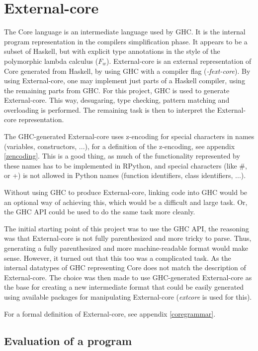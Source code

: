 
\section{External-core}


The Core language is an intermediate language used by GHC. It is the internal
program representation in the compilers simplification phase. It appears to be a
subset of Haskell, but with explicit type annotations in the style of the polymorphic
lambda calculus ($F_w$). External-core
is an external representation of Core generated from Haskell, by using GHC with a compiler 
flag (\emph{-fext-core}). By using External-core, one
may implement just parts of a Haskell compiler, using the remaining parts from
GHC. For this project, GHC is used to generate External-core. This way, desugaring,
type checking, pattern matching and overloading is performed. The remaining task
is then to interpret the External-core representation. \cite{tolmach2010ghc}

The GHC-generated External-core uses z-encoding for special characters in names 
(variables, constructors, ...), for
a definition of the z-encoding, see appendix \ref{zencoding}. This is a good thing, as much
of the functionality represented by these names has to be implemented in RPython,
and special characters (like \#{}, or +) is not allowed in Python names (function
identifiers, class identifiers, ...).

Without using GHC to produce External-core, linking code into GHC would be an 
optional way of achieving this, which would be a difficult and large task.
Or, the GHC API could be used to do the same task more cleanly. \cite{tolmach2010ghc}

The initial starting point of this project was to use the GHC API, the reasoning
was that External-core is not fully parenthesized and more tricky to parse. Thus,
generating a fully parenthesized and more machine-readable format would make sense.
However, it turned out that this too was a complicated task. As the internal
datatypes of GHC representing Core does not match the description of External-core. 
The choice was
then made to use GHC-generated External-core as the base for creating a new intermediate
format that could be easily generated using available packages for manipulating
External-core (\emph{extcore} is used for this).

For a formal definition of External-core, see appendix \ref{coregrammar}.

\subsection{Evaluation of a program}

